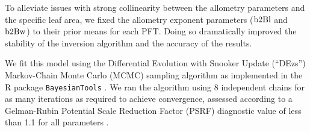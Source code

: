 To alleviate issues with strong collinearity between the allometry parameters and the specific leaf area, we fixed the allometry exponent parameters ($\mathrm{b2Bl}$ and $\mathrm{b2Bw}$) to their prior means for each PFT.
Doing so dramatically improved the stability of the inversion algorithm and the accuracy of the results.

We fit this model using the Differential Evolution with Snooker Update (``DEzs'') Markov-Chain Monte Carlo (MCMC) sampling algorithm \citep{terbraak2008differential} as implemented in the R package \texttt{BayesianTools} \citep{bayesiantools}.
We ran the algorithm using 8 independent chains for as many iterations as required to achieve convergence, assessed according to a Gelman-Rubin Potential Scale Reduction Factor (PSRF) diagnostic value of less than 1.1 for all parameters \citep{gelman1992inference}.

